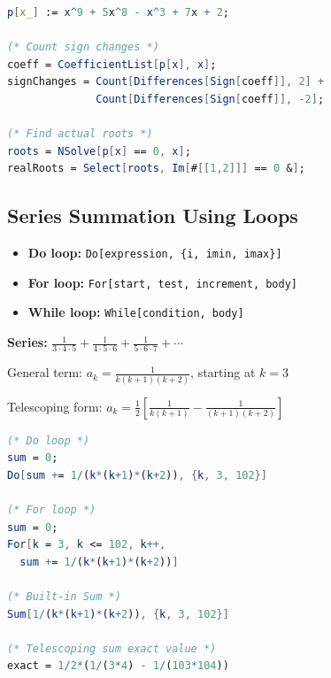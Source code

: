 \documentclass[12pt,a4paper]{article}
\begin{document}
\begin{mathematicabox}
    \begin{lstlisting}[language=Mathematica, basicstyle=\ttfamily\small]
p[x_] := x^9 + 5x^8 - x^3 + 7x + 2;

(* Count sign changes *)
coeff = CoefficientList[p[x], x];
signChanges = Count[Differences[Sign[coeff]], 2] + 
              Count[Differences[Sign[coeff]], -2];

(* Find actual roots *)
roots = NSolve[p[x] == 0, x];
realRoots = Select[roots, Im[#[[1,2]]] == 0 &];
    \end{lstlisting}
\end{mathematicabox}

\subsection{Series Summation Using Loops}

\begin{definitionbox}
    \begin{itemize}
        \item \textbf{Do loop:} \texttt{Do[expression, \{i, imin, imax\}]}
        \item \textbf{For loop:} \texttt{For[start, test, increment, body]}
        \item \textbf{While loop:} \texttt{While[condition, body]}
    \end{itemize}
\end{definitionbox}

\begin{formulabox}
    \textbf{Series:} \( \displaystyle \frac{1}{3\cdot4\cdot5} + \frac{1}{4\cdot5\cdot6} + \frac{1}{5\cdot6\cdot7} + \cdots \)
    
    General term: \( a_k = \frac{1}{k(k+1)(k+2)} \), starting at \(k=3\)
    
    Telescoping form: \( a_k = \frac{1}{2}\left[\frac{1}{k(k+1)} - \frac{1}{(k+1)(k+2)}\right] \)
\end{formulabox}

\begin{mathematicabox}
    \begin{lstlisting}[language=Mathematica, basicstyle=\ttfamily\small]
(* Do loop *)
sum = 0;
Do[sum += 1/(k*(k+1)*(k+2)), {k, 3, 102}]

(* For loop *)
sum = 0;
For[k = 3, k <= 102, k++, 
  sum += 1/(k*(k+1)*(k+2))]

(* Built-in Sum *)
Sum[1/(k*(k+1)*(k+2)), {k, 3, 102}]

(* Telescoping sum exact value *)
exact = 1/2*(1/(3*4) - 1/(103*104))
    \end{lstlisting}
\end{mathematicabox}
\end{document}
